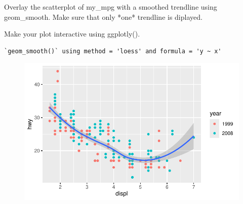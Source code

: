 \documentclass[
  letterpaper,
  DIV=11,
  numbers=noendperiod]{scrartcl}
\newenvironment{Shaded}{\begin{snugshade}}{\end{snugshade}}
\newcommand{\AttributeTok}[1]{\textcolor[rgb]{0.40,0.45,0.13}{#1}}
\newcommand{\FunctionTok}[1]{\textcolor[rgb]{0.28,0.35,0.67}{#1}}
\newcommand{\NormalTok}[1]{\textcolor[rgb]{0.00,0.23,0.31}{#1}}
\newcommand{\OtherTok}[1]{\textcolor[rgb]{0.00,0.23,0.31}{#1}}
\newcommand{\SpecialCharTok}[1]{\textcolor[rgb]{0.37,0.37,0.37}{#1}}
\begin{document}
Overlay the scatterplot of my\_mpg with a smoothed trendline using
geom\_smooth. Make sure that only *one* trendline is diplayed.

Make your plot interactive using ggplotly().

\begin{Shaded}
\end{Shaded}

\begin{verbatim}
`geom_smooth()` using method = 'loess' and formula = 'y ~ x'
\end{verbatim}

\begin{figure}[H]

{\centering \includegraphics{Part1_Lecture1_Ex_files/figure-pdf/unnamed-chunk-31-1.pdf}

}

\end{figure}
\end{document}
